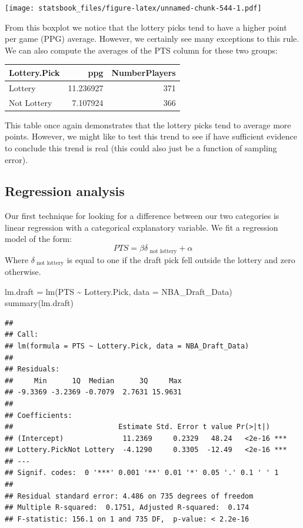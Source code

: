 \documentclass[
]{book}
\newenvironment{Shaded}{\begin{snugshade}}{\end{snugshade}}
\newcommand{\AttributeTok}[1]{\textcolor[rgb]{0.77,0.63,0.00}{#1}}
\newcommand{\FunctionTok}[1]{\textcolor[rgb]{0.00,0.00,0.00}{#1}}
\newcommand{\NormalTok}[1]{#1}
\newcommand{\OtherTok}[1]{\textcolor[rgb]{0.56,0.35,0.01}{#1}}
\newcommand{\SpecialCharTok}[1]{\textcolor[rgb]{0.00,0.00,0.00}{#1}}
\theoremstyle{definition}
\theoremstyle{definition}
\theoremstyle{definition}
\theoremstyle{definition}
\theoremstyle{remark}
\begin{document}
\texttt{[image: statsbook\_files/figure-latex/unnamed-chunk-544-1.pdf]}

From this boxplot we notice that the lottery picks tend to have a higher point per game (PPG) average. However, we certainly see many exceptions to this rule. We can also compute the averages of the PTS column for these two groups:

\begin{tabular}{l|r|r}
\hline
Lottery.Pick & ppg & NumberPlayers\\
\hline
Lottery & 11.236927 & 371\\
\hline
Not Lottery & 7.107924 & 366\\
\hline
\end{tabular}

This table once again demonstrates that the lottery picks tend to average more points. However, we might like to test this trend to see if have sufficient evidence to conclude this trend is real (this could also just be a function of sampling error).

\hypertarget{regression-analysis}{%
\subsection{Regression analysis}\label{regression-analysis}}

Our first technique for looking for a difference between our two categories is linear regression with a categorical explanatory variable. We fit a regression model of the form:
\[PTS=\beta \delta_{\text{ not lottery}}+\alpha\]
Where \(\delta_{\text{ not lottery}}\) is equal to one if the draft pick fell outside the lottery and zero otherwise.

\begin{Shaded}
\begin{Highlighting}[]
\NormalTok{lm.draft }\OtherTok{=} \FunctionTok{lm}\NormalTok{(PTS }\SpecialCharTok{\textasciitilde{}}\NormalTok{ Lottery.Pick, }\AttributeTok{data =}\NormalTok{ NBA\_Draft\_Data)}
\FunctionTok{summary}\NormalTok{(lm.draft)}
\end{Highlighting}
\end{Shaded}

\begin{verbatim}
## 
## Call:
## lm(formula = PTS ~ Lottery.Pick, data = NBA_Draft_Data)
## 
## Residuals:
##     Min      1Q  Median      3Q     Max 
## -9.3369 -3.2369 -0.7079  2.7631 15.9631 
## 
## Coefficients:
##                         Estimate Std. Error t value Pr(>|t|)    
## (Intercept)              11.2369     0.2329   48.24   <2e-16 ***
## Lottery.PickNot Lottery  -4.1290     0.3305  -12.49   <2e-16 ***
## ---
## Signif. codes:  0 '***' 0.001 '**' 0.01 '*' 0.05 '.' 0.1 ' ' 1
## 
## Residual standard error: 4.486 on 735 degrees of freedom
## Multiple R-squared:  0.1751, Adjusted R-squared:  0.174 
## F-statistic: 156.1 on 1 and 735 DF,  p-value: < 2.2e-16
\end{verbatim}
\end{document}
